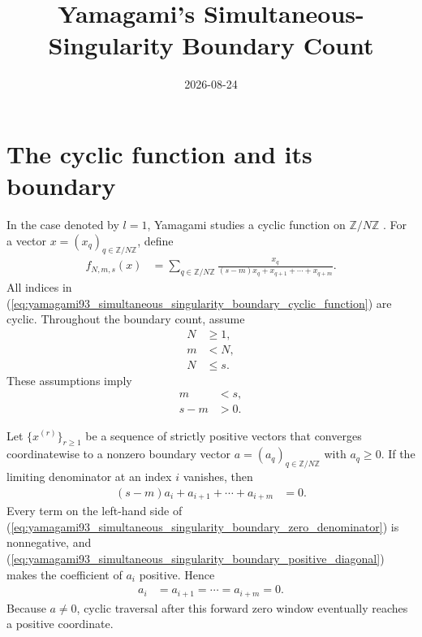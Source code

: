 \documentclass[11pt]{article}
\title{Yamagami's Simultaneous-Singularity Boundary Count}
\author{}
\date{2026-08-24}
\begin{document}
\maketitle
{}

\section{The cyclic function and its boundary}

In the case denoted by $l=1$, Yamagami studies a cyclic function on
$\mathbb Z/N\mathbb Z$ \cite[pp.~524--525]{Yamagami1993Cyclic}. For a vector
$x=(x_q)_{q\in\mathbb Z/N\mathbb Z}$, define
\begin{align}
    f_{N,m,s}(x)
        &=
        \sum_{q\in\mathbb Z/N\mathbb Z}
        \frac{x_q}
        {(s-m)x_q+x_{q+1}+\cdots+x_{q+m}}.
    \label{eq:yamagami93_simultaneous_singularity_boundary_cyclic_function}
\end{align}
All indices in
(\ref{eq:yamagami93_simultaneous_singularity_boundary_cyclic_function}) are
cyclic. Throughout the boundary count, assume
\begin{align}
    N
        &\geq 1,
    \label{eq:yamagami93_simultaneous_singularity_boundary_dimension}\\
    m
        &< N,
    \label{eq:yamagami93_simultaneous_singularity_boundary_window_length}\\
    N
        &\leq s.
    \label{eq:yamagami93_simultaneous_singularity_boundary_parameter_bound}
\end{align}
These assumptions imply
\begin{align}
    m
        &< s,
    \label{eq:yamagami93_simultaneous_singularity_boundary_strict_parameter}\\
    s-m
        &> 0.
    \label{eq:yamagami93_simultaneous_singularity_boundary_positive_diagonal}
\end{align}

Let $\{x^{(r)}\}_{r\geq 1}$ be a sequence of strictly positive vectors that
converges coordinatewise to a nonzero boundary vector
$a=(a_q)_{q\in\mathbb Z/N\mathbb Z}$ with $a_q\geq 0$. If the limiting
denominator at an index $i$ vanishes, then
\begin{align}
    (s-m)a_i+a_{i+1}+\cdots+a_{i+m}
        &= 0.
    \label{eq:yamagami93_simultaneous_singularity_boundary_zero_denominator}
\end{align}
Every term on the left-hand side of
(\ref{eq:yamagami93_simultaneous_singularity_boundary_zero_denominator}) is
nonnegative, and
(\ref{eq:yamagami93_simultaneous_singularity_boundary_positive_diagonal})
makes the coefficient of $a_i$ positive. Hence
\begin{align}
    a_i
        &= a_{i+1}
         = \cdots
         = a_{i+m}
         = 0.
    \label{eq:yamagami93_simultaneous_singularity_boundary_zero_window}
\end{align}
Because $a\neq 0$, cyclic traversal after this forward zero window eventually
reaches a positive coordinate.
\end{document}

